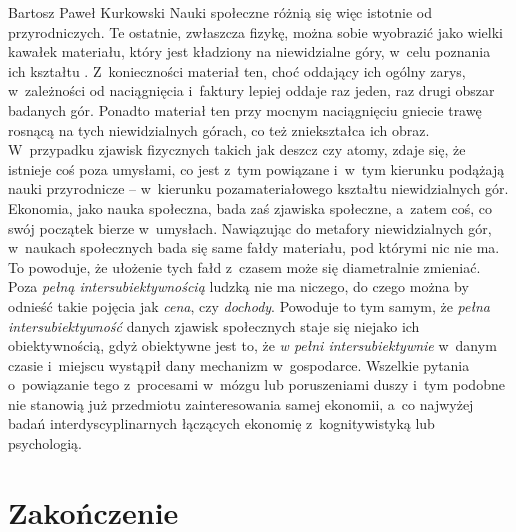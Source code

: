 \begin{artplenv}{Bartosz Paweł Kurkowski}
Nauki społeczne różnią się więc istotnie od przyrodniczych. Te ostatnie, zwłaszcza fizykę, można sobie wyobrazić jako
wielki kawałek materiału, który jest kładziony na niewidzialne góry, w~celu poznania ich kształtu
\parencite[s.~127]{grobler_prawda_2000}.
Z~konieczności materiał ten, choć oddający ich ogólny
zarys, w~zależności od naciągnięcia i~faktury lepiej oddaje raz jeden, raz drugi obszar badanych gór. Ponadto materiał ten przy
mocnym naciągnięciu gniecie trawę rosnącą na tych niewidzialnych górach, co też zniekształca ich obraz. W~przypadku
zjawisk fizycznych takich jak deszcz czy atomy, zdaje się, że istnieje coś poza umysłami, co jest z~tym
powiązane i~w~tym kierunku podążają nauki przyrodnicze -- w~kierunku pozamateriałowego kształtu niewidzialnych gór. Ekonomia, jako
nauka społeczna, bada zaś zjawiska społeczne, a~zatem coś, co swój początek bierze w~umysłach. Nawiązując do metafory
niewidzialnych gór, w~naukach społecznych bada się same fałdy materiału, pod którymi nic nie ma. To powoduje, że
ułożenie tych fałd z~czasem może się diametralnie zmieniać. Poza \textit{pełną intersubiektywnością} ludzką nie ma
niczego, do czego można by odnieść takie pojęcia jak \textit{cena}, czy \textit{dochody}. Powoduje to tym samym, że
\textit{pełna intersubiektywność} danych zjawisk społecznych staje się niejako ich obiektywnością, gdyż obiektywne jest
to, że \textit{w pełni intersubiektywnie} w~danym czasie i~miejscu wystąpił dany mechanizm w~gospodarce. Wszelkie
pytania o~powiązanie tego z~procesami w~mózgu lub poruszeniami duszy i~tym podobne nie stanowią już przedmiotu
zainteresowania samej ekonomii, a~co najwyżej badań interdyscyplinarnych łączących ekonomię z~kognitywistyką lub
psychologią.

\section*{Zakończenie}


\end{artplenv}

